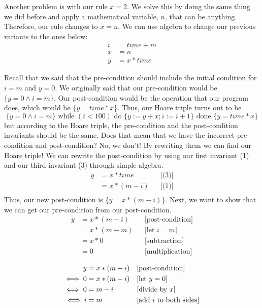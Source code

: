\documentclass{article}
\begin{document}
\vspace{\baselineskip}
Another problem is with our rule $x = 2$. We solve this by doing the same thing we did before and apply a mathematical variable, $n$, that can be anything. Therefore, our rule changes to $ x = n$. We can use algebra to change our previous variants to the ones below:
\begin{align*}
    i &= time + m\\
    x &= n \\
    y &= x * time
\end{align*}

Recall that we said that the pre-condition should include the initial condition for $i = m$ and $y = 0$. We originally said that our pre-condition would be $\{ y = 0 \wedge i = m \}$. Our post-condition would be the operation that our program does, which would be $\{y = time * x\}$. Thus, our Hoare triple turns out to be
$$\{ y = 0 \wedge i = m \} \text{ while } (i < 100) \text{ do } \{y := y + x; i := i + 1\} \text{ done } \{y = time * x\}$$
but according to the Hoare triple, the pre-condition and the post-condition invariants should be the same. Does that mean that we have the incorrect pre-condition and post-condition? No, we don't! By rewriting them we can find our Hoare triple! We can rewrite the post-condition by using our first invariant (1) and our third invariant (3) through simple algebra.
\begin{align*}
    y &= x * time &&\text{[(3)]} \\
      &= x * (m - i) &&\text{[(1)]} \\
\end{align*}
Thus, our new post-condition is $\{ y = x * (m-i)\}$. Next, we want to show that we can get our pre-condition from our post-condition.
\begin{align*}
    y &= x * (m - i) &&\text{[post-condition]} \\
      &= x * (m - m) &&\text{[let $i = m$]} \\
      &= x * 0 &&\text{[subtraction]} \\
      &= 0 &&\text{[multiplication]} \\
\end{align*}
\begin{align*}
    y &= x * (m - i) &&\text{[post-condition]} \\
    \iff 0 &= x * (m - i) &&\text{[let $ y = 0$]} \\
    \iff 0 &= m - i &&\text{[divide by $x$]} \\
    \iff i &= m &&\text{[add $i$ to both sides]} \\
\end{align*}
\end{document}
